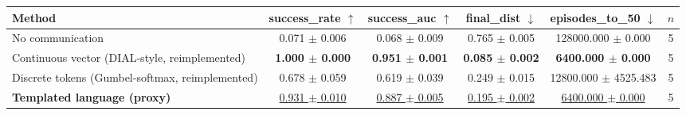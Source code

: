 \begin{tabular}{lccccc}
\toprule
Method & success\_rate $\uparrow$ & success\_auc $\uparrow$ & final\_dist $\downarrow$ & episodes\_to\_50 $\downarrow$ & $n$ \\
\midrule
No communication & 0.071 $\pm$ 0.006 & 0.068 $\pm$ 0.009 & 0.765 $\pm$ 0.005 & 128000.000 $\pm$ 0.000 & 5 \\
Continuous vector (DIAL-style, reimplemented) & \textbf{1.000 $\pm$ 0.000} & \textbf{0.951 $\pm$ 0.001} & \textbf{0.085 $\pm$ 0.002} & \textbf{6400.000 $\pm$ 0.000} & 5 \\
Discrete tokens (Gumbel-softmax, reimplemented) & 0.678 $\pm$ 0.059 & 0.619 $\pm$ 0.039 & 0.249 $\pm$ 0.015 & 12800.000 $\pm$ 4525.483 & 5 \\
\textbf{Templated language (proxy)} & \underline{0.931 $\pm$ 0.010} & \underline{0.887 $\pm$ 0.005} & \underline{0.195 $\pm$ 0.002} & \underline{6400.000 $\pm$ 0.000} & 5 \\
\bottomrule
\end{tabular}
